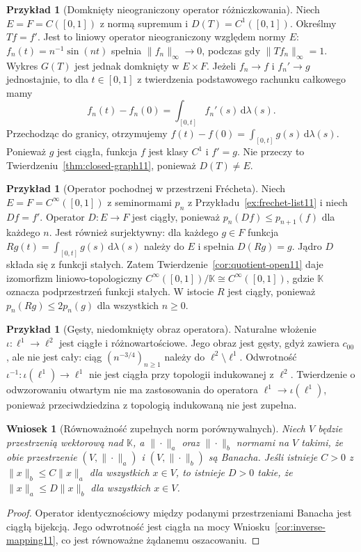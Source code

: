 \documentclass[11pt,a4paper]{article}
\numberwithin{equation}{section}
\theoremstyle{plain}
\newtheorem{wniosek}[twierdzenie]{Wniosek}
\theoremstyle{definition}
\newtheorem{przyklad}[twierdzenie]{Przykład}
\theoremstyle{remark}
\newcommand{\K}{\mathbb K}
\begin{document}
\begin{przyklad}[Domknięty nieograniczony operator różniczkowania]
\label{ex:closed-derivative11}
Niech $E=F=C([0,1])$ z normą supremum i
$D(T)=C^1([0,1])$. Określmy $Tf=f'$. Jest to liniowy
operator nieograniczony względem normy $E$:
$f_n(t)=n^{-1}\sin(nt)$ spełnia $\|f_n\|_\infty\to0$,
podczas gdy $\|Tf_n\|_\infty=1$.
Wykres $G(T)$ jest jednak domknięty w $E\times F$.
Jeżeli $f_n\to f$ i $f_n'\to g$ jednostajnie,
to dla $t\in[0,1]$ z twierdzenia podstawowego rachunku
całkowego mamy
\[
 f_n(t)-f_n(0)=\int_{[0,t]}f_n'(s)\,\mathrm d\lambda(s).
\]
Przechodząc do granicy, otrzymujemy
$f(t)-f(0)=\int_{[0,t]}g(s)\,\mathrm d\lambda(s)$.
Ponieważ $g$ jest ciągła, funkcja $f$ jest klasy $C^1$
i $f'=g$. Nie przeczy to Twierdzeniu~\ref{thm:closed-graph11},
ponieważ $D(T)\ne E$.
\end{przyklad}

\begin{przyklad}[Operator pochodnej w przestrzeni Frécheta]
\label{ex:frechet-derivative11}
Niech $E=F=C^\infty([0,1])$ z seminormami $p_n$
z Przykładu~\ref{ex:frechet-list11} i niech $Df=f'$.
Operator $D:E\to F$ jest ciągły, ponieważ
$p_n(Df)\le p_{n+1}(f)$ dla każdego $n$.
Jest również surjektywny: dla każdego $g\in F$ funkcja
$Rg(t)=\int_{[0,t]}g(s)\,\mathrm d\lambda(s)$ należy do $E$
i spełnia $D(Rg)=g$. Jądro $D$ składa się z funkcji stałych.
Zatem Twierdzenie~\ref{cor:quotient-open11} daje
izomorfizm liniowo-topologiczny
$C^\infty([0,1])/\K\cong C^\infty([0,1])$,
gdzie $\K$ oznacza podprzestrzeń funkcji stałych.
W istocie $R$ jest ciągły, ponieważ
$p_n(Rg)\le 2p_n(g)$ dla wszystkich $n\ge0$.
\end{przyklad}

\begin{przyklad}[Gęsty, niedomknięty obraz operatora]
\label{ex:dense-range11}
Naturalne włożenie $\iota:\ell^1\to\ell^2$ jest
ciągłe i różnowartościowe. Jego obraz jest gęsty, gdyż
zawiera $c_{00}$, ale nie jest cały: ciąg
$(n^{-3/4})_{n\ge1}$ należy do $\ell^2\setminus\ell^1$.
Odwrotność $\iota^{-1}:\iota(\ell^1)\to\ell^1$
nie jest ciągła przy topologii indukowanej z $\ell^2$.
Twierdzenie o odwzorowaniu otwartym nie ma zastosowania
do operatora $\ell^1\to\iota(\ell^1)$, ponieważ
przeciwdziedzina z topologią indukowaną nie jest zupełna.
\end{przyklad}

\begin{wniosek}[Równoważność zupełnych norm porównywalnych]
\label{cor:two-banach-norms11}
Niech $V$ będzie przestrzenią wektorową nad $\K$,
a $\|\cdot\|_a$ oraz $\|\cdot\|_b$ normami na $V$
takimi, że obie przestrzenie $(V,\|\cdot\|_a)$ i
$(V,\|\cdot\|_b)$ są Banacha. Jeśli istnieje $C>0$
z $\|x\|_b\le C\|x\|_a$ dla wszystkich $x\in V$,
to istnieje $D>0$ takie, że
$\|x\|_a\le D\|x\|_b$ dla wszystkich $x\in V$.
\end{wniosek}
\begin{proof}
Operator identycznościowy między podanymi przestrzeniami
Banacha jest ciągłą bijekcją. Jego odwrotność jest ciągła
na mocy Wniosku~\ref{cor:inverse-mapping11}, co jest
równoważne żądanemu oszacowaniu.
\end{proof}
\end{document}
